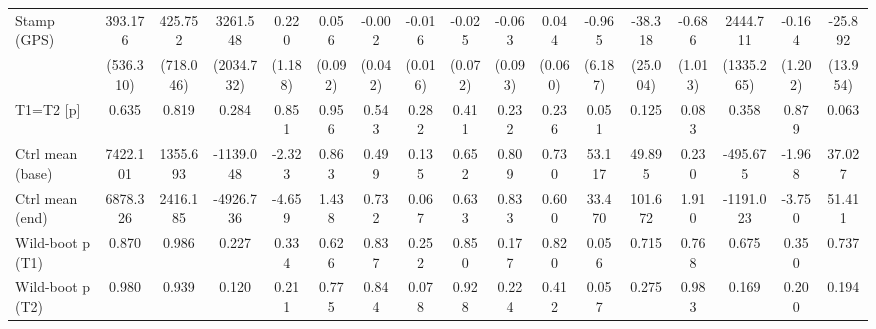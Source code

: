 {\begin{tabular}{l*{16}{c}}
Stamp (GPS)         &     393.176         &     425.752         &    3261.548         &       0.220         &       0.056         &      -0.002         &      -0.016         &      -0.025         &      -0.063         &       0.044         &      -0.965         &     -38.318         &      -0.686         &    2444.711         &      -0.164         &     -25.892         \\
                    &   (536.310)         &   (718.046)         &  (2034.732)         &     (1.188)         &     (0.092)         &     (0.042)         &     (0.016)         &     (0.072)         &     (0.093)         &     (0.060)         &     (6.187)         &    (25.004)         &     (1.013)         &  (1335.265)         &     (1.202)         &    (13.954)         \\
\midrule
T1=T2 [p]           &       0.635         &       0.819         &       0.284         &       0.851         &       0.956         &       0.543         &       0.282         &       0.411         &       0.232         &       0.236         &       0.051         &       0.125         &       0.083         &       0.358         &       0.879         &       0.063         \\
Ctrl mean (base)    &    7422.101         &    1355.693         &   -1139.048         &      -2.323         &       0.863         &       0.499         &       0.135         &       0.652         &       0.809         &       0.730         &      53.117         &      49.895         &       0.230         &    -495.675         &      -1.968         &      37.027         \\
Ctrl mean (end)     &    6878.326         &    2416.185         &   -4926.736         &      -4.659         &       1.438         &       0.732         &       0.067         &       0.633         &       0.833         &       0.600         &      33.470         &     101.672         &       1.910         &   -1191.023         &      -3.750         &      51.411         \\
Wild-boot p (T1)    &       0.870         &       0.986         &       0.227         &       0.334         &       0.626         &       0.837         &       0.252         &       0.850         &       0.177         &       0.820         &       0.056         &       0.715         &       0.768         &       0.675         &       0.350         &       0.737         \\
Wild-boot p (T2)    &       0.980         &       0.939         &       0.120         &       0.211         &       0.775         &       0.844         &       0.078         &       0.928         &       0.224         &       0.412         &       0.057         &       0.275         &       0.983         &       0.169         &       0.200         &       0.194         \\

\end{tabular}}
